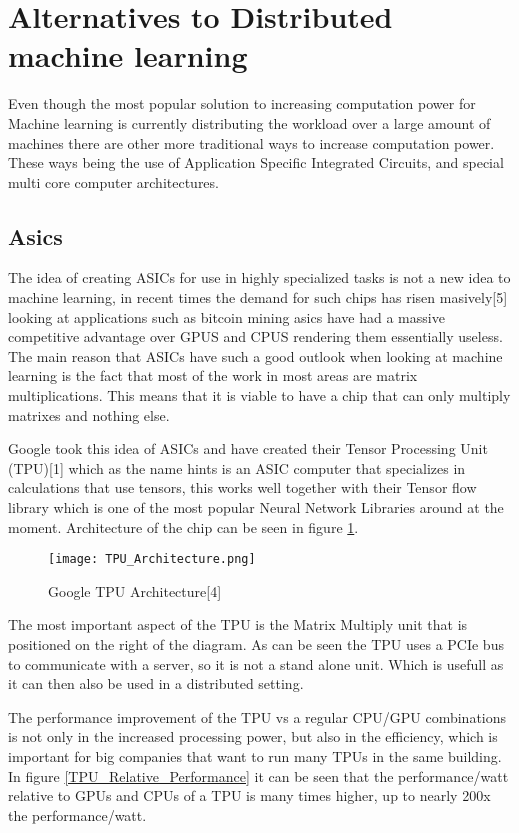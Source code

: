 
\section{Alternatives to Distributed machine learning}
Even though the most popular solution to increasing computation power for Machine
learning is currently distributing the workload over a large amount of machines
there are other more traditional ways to increase computation power. These ways
being the use of Application Specific Integrated Circuits, and special multi core
computer architectures.

\subsection{Asics}
The idea of creating ASICs for use in highly specialized tasks is not a new idea
to machine learning, in recent times the demand for such chips has risen masively[5]
looking at applications such as bitcoin mining asics have had a massive competitive
advantage over GPUS and CPUS rendering them essentially useless. The main reason
that ASICs have such a good outlook when looking at machine
learning is the fact that most of the work in most areas are matrix multiplications.
This means that it is viable to have a chip that can only multiply matrixes and nothing
else.

Google took this idea of ASICs and have created their Tensor Processing Unit (TPU)[1]
which as the name hints is an ASIC computer that specializes in calculations that
use tensors, this works well together with their Tensor flow library which is one
of the most popular Neural Network Libraries around at the moment. Architecture of
the chip can be seen in figure \ref{TPU_Architecture}.

\begin{figure}
  \texttt{[image: TPU\_Architecture.png]}
  \caption{Google TPU Architecture[4]}
  \label{TPU_Architecture}
\end{figure}

The most important aspect of the TPU is the Matrix Multiply unit that is positioned
on the right of the diagram. As can be seen the TPU uses a PCIe bus to communicate
with a server, so it is not a stand alone unit. Which is usefull as it can then also
be used in a distributed setting.

The performance improvement of the TPU vs a regular CPU/GPU combinations is not only
in the increased processing power, but also in the efficiency, which is important
for big companies that want to run many TPUs in the same building. In figure \ref{TPU_Relative_Performance}
it can be seen that the performance/watt relative to GPUs and CPUs of a TPU is many times higher,
up to nearly 200x the performance/watt.

